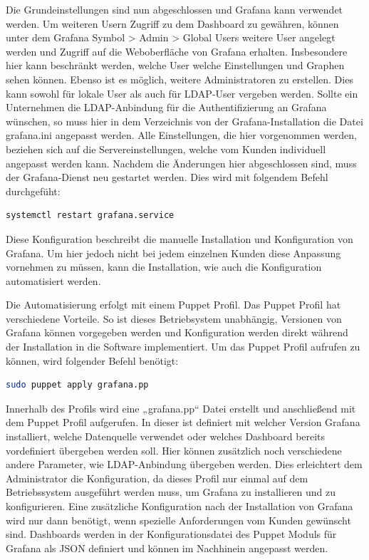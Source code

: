 Die Grundeinstellungen sind nun abgeschlossen und Grafana kann verwendet
werden. Um weiteren Usern Zugriff zu dem Dashboard zu gewähren, können unter
dem Grafana Symbol > Admin > Global Users weitere User angelegt werden und
Zugriff auf die Weboberfläche von Grafana erhalten. Insbesondere hier kann
beschränkt werden, welche User welche Einstellungen und Graphen sehen können.
Ebenso ist es möglich, weitere Administratoren zu erstellen. Dies kann sowohl
für lokale User als auch für LDAP-User vergeben werden.  Sollte ein Unternehmen
die LDAP-Anbindung für die Authentifizierung an Grafana wünschen, so muss hier
in dem Verzeichnis von der Grafana-Installation die Datei grafana.ini angepasst
werden. Alle Einstellungen, die hier vorgenommen werden, beziehen sich auf die
Servereinstellungen, welche vom Kunden individuell angepasst werden kann.
Nachdem die Änderungen hier abgeschlossen sind, muss der Grafana-Dienst neu
gestartet werden. Dies wird mit folgendem Befehl durchgefüht:

\begin{lstlisting}[language=bash]
systemctl restart grafana.service
\end{lstlisting}

Diese Konfiguration beschreibt die manuelle Installation und Konfiguration von
Grafana. Um hier jedoch nicht bei jedem einzelnen Kunden diese Anpassung
vornehmen zu müssen, kann die Installation, wie auch die Konfiguration
automatisiert werden.

Die Automatisierung erfolgt mit einem Puppet Profil. Das Puppet Profil hat
verschiedene Vorteile. So ist dieses Betriebsystem unabhängig, Versionen von
Grafana können vorgegeben werden und Konfiguration werden direkt während der
Installation in die Software implementiert. Um das Puppet Profil aufrufen zu
können, wird folgender Befehl benötigt:

\begin{lstlisting}[language=bash]
sudo puppet apply grafana.pp
\end{lstlisting}

Innerhalb des Profils wird eine „grafana.pp“ Datei erstellt und anschließend
mit dem Puppet Profil aufgerufen. In dieser ist definiert mit welcher Version
Grafana installiert, welche Datenquelle verwendet oder welches Dashboard
bereits vordefiniert übergeben werden soll. Hier können zusätzlich noch
verschiedene andere Parameter, wie LDAP-Anbindung übergeben werden. Dies
erleichtert dem Administrator die Konfiguration, da dieses Profil nur einmal
auf dem Betriebssystem ausgeführt werden muss, um Grafana zu installieren und
zu konfigurieren. Eine zusätzliche Konfiguration nach der Installation von
Grafana wird nur dann benötigt, wenn spezielle Anforderungen vom Kunden
gewünscht sind.  Dashboards werden in der Konfigurationsdatei des Puppet Moduls
für Grafana als \gls{JSON} definiert und können im Nachhinein angepasst werden.

